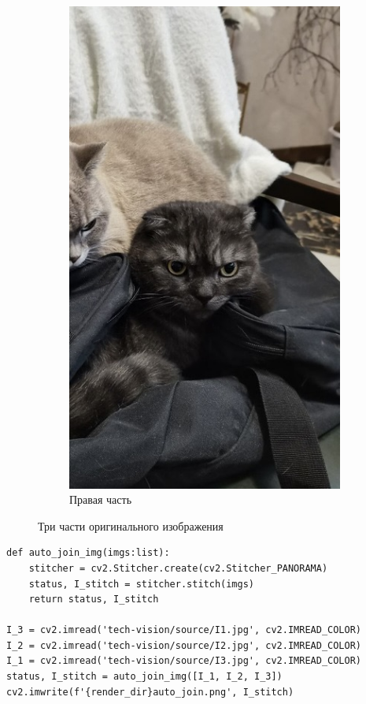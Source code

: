 \documentclass[a4paper, 16pt]{article}
\begin{document}
\begin{figure}[!htb]
\begin{subfigure}[b]{0.3\textwidth}
        \includegraphics[width=\textwidth]{I3.jpg}
        \caption{Правая часть}
        \label{fig:right}
    \end{subfigure}
    \caption{Три части оригинального изображения}
    \label{fig:three_images}
\end{figure}


\begin{lstlisting}[label=aujoin-code,caption=Код для автоматической склейки изображений]
def auto_join_img(imgs:list):
    stitcher = cv2.Stitcher.create(cv2.Stitcher_PANORAMA)
    status, I_stitch = stitcher.stitch(imgs)
    return status, I_stitch

I_3 = cv2.imread('tech-vision/source/I1.jpg', cv2.IMREAD_COLOR)
I_2 = cv2.imread('tech-vision/source/I2.jpg', cv2.IMREAD_COLOR)
I_1 = cv2.imread('tech-vision/source/I3.jpg', cv2.IMREAD_COLOR)
status, I_stitch = auto_join_img([I_1, I_2, I_3])
cv2.imwrite(f'{render_dir}auto_join.png', I_stitch)
\end{lstlisting}
\end{document}
